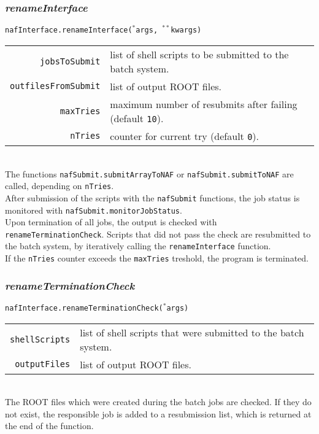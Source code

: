 \documentclass[12pt, a4paper]{article}
\newcommand{\args}{$^*$args}
\newcommand{\kwargs}{$^{**}$kwargs}
\begin{document}
\subsubsection{\textit{renameInterface}}
\texttt{nafInterface.renameInterface(\args, \kwargs)}\\
\begin{tabular}{r|l}
\hline
\texttt{jobsToSubmit}		&	list of shell scripts to be submitted to the batch system.\\
\texttt{outfilesFromSubmit}	&	list of output ROOT files.\\
\texttt{maxTries}			&	maximum number of resubmits after failing (default \texttt{10}).\\
\texttt{nTries}				&	counter for current try (default \texttt{0}).\\
\hline
\end{tabular}
\\
The functions \texttt{nafSubmit.submitArrayToNAF} or \texttt{nafSubmit.submitToNAF} are called, depending on \texttt{nTries}.\\
After submission of the scripts with the \texttt{nafSubmit} functions, the job status is monitored with \texttt{nafSubmit.monitorJobStatus}.\\
Upon termination of all jobs, the output is checked with \texttt{renameTerminationCheck}. Scripts that did not pass the check are resubmitted to the batch system, by iteratively calling the \texttt{renameInterface} function.\\
If the \texttt{nTries} counter exceeds the \texttt{maxTries} treshold, the program is terminated.



\subsubsection{\textit{renameTerminationCheck}}
\texttt{nafInterface.renameTerminationCheck(\args)}\\
\begin{tabular}{r|l}
\hline
\texttt{shellScripts}	&	list of shell scripts that were submitted to the batch system.\\
\texttt{outputFiles}	&	list of output ROOT files.\\
\hline
\end{tabular}
\\
The ROOT files which were created during the batch jobs are checked. If they do not exist, the responsible job is added to a resubmission list, which is returned at the end of the function.
\end{document}
